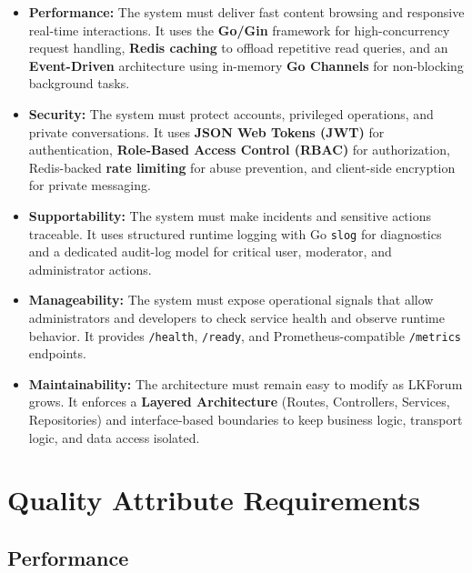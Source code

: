 \documentclass{scrreprt}
\begin{document}
\begin{itemize}[leftmargin=2cm]
    \item \textbf{Performance:} The system must deliver fast content browsing and responsive real-time interactions. It uses the \textbf{Go/Gin} framework for high-concurrency request handling, \textbf{Redis caching} to offload repetitive read queries, and an \textbf{Event-Driven} architecture using in-memory \textbf{Go Channels} for non-blocking background tasks.
    \item \textbf{Security:} The system must protect accounts, privileged operations, and private conversations. It uses \textbf{JSON Web Tokens (JWT)} for authentication, \textbf{Role-Based Access Control (RBAC)} for authorization, Redis-backed \textbf{rate limiting} for abuse prevention, and client-side encryption for private messaging.
    \item \textbf{Supportability:} The system must make incidents and sensitive actions traceable. It uses structured runtime logging with Go \texttt{slog} for diagnostics and a dedicated audit-log model for critical user, moderator, and administrator actions.
    \item \textbf{Manageability:} The system must expose operational signals that allow administrators and developers to check service health and observe runtime behavior. It provides \texttt{/health}, \texttt{/ready}, and Prometheus-compatible \texttt{/metrics} endpoints.
    \item \textbf{Maintainability:} The architecture must remain easy to modify as LKForum grows. It enforces a \textbf{Layered Architecture} (Routes, Controllers, Services, Repositories) and interface-based boundaries to keep business logic, transport logic, and data access isolated.
\end{itemize}

\chapter{Quality Attribute Requirements}

\section{Performance}
\end{document}
